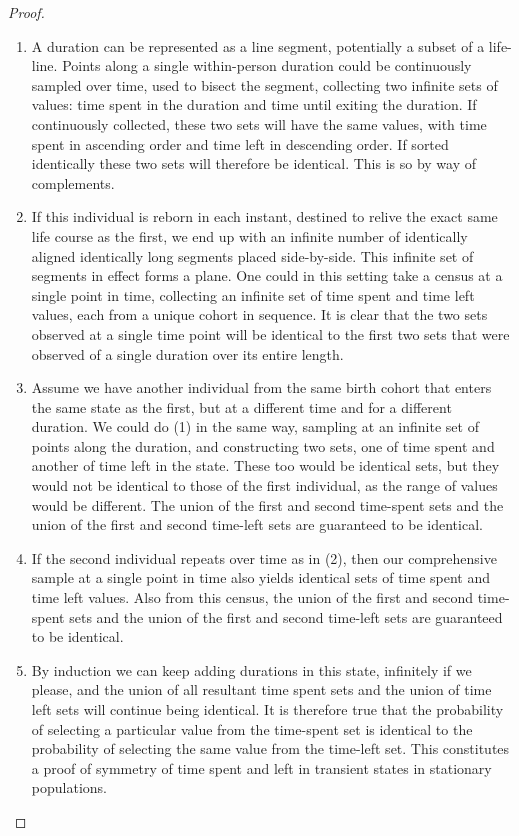 \documentclass[12pt,oneside,a4paper]{article} %
\theoremstyle{definition}
\begin{document}
\begin{proof}

\begin{enumerate}
\item{} A duration can be represented as a line segment, potentially a
subset of a life-line. Points along a single within-person duration could be continuously
sampled over time, used to bisect the segment, collecting two infinite sets of
values: time spent in the duration and time until exiting the duration. If
continuously collected, these two sets will have the same values, with time
spent in ascending order and time left in descending order. If sorted
identically these two sets will therefore be identical. This is so by way of
complements.

\item{} If this individual is reborn in each instant, destined to relive the
exact same life course as the first, we end up with an infinite
number of identically aligned identically long segments placed side-by-side.
This infinite set of segments in effect forms a plane. One could in this
setting take a census at a single point in time, collecting an infinite set of
time spent and time left values, each from a unique cohort in sequence. It is
clear that the two sets observed at a single time point will be identical
to the first two sets that were observed of a single duration over its entire
length.

\item{} Assume we have another individual from the same birth cohort that enters
the same state as the first, but at a different time and for a different
duration. We could do (1) in the same way, sampling at an infinite set of points
along the duration, and constructing two sets, one of time spent and another of
time left in the state. These too would be identical sets, but they would not be
identical to those of the first individual, as the range of values would be
different. The union of the first and second time-spent sets and the union of
the first and second time-left sets are guaranteed to be identical. 

\item{} If the second individual repeats over time as in (2), then our
comprehensive sample at a single point in time also yields identical sets
of time spent and time left values. Also from this census, the union of the
first and second time-spent sets and the union of the first and second time-left sets
are guaranteed to be identical. 

\item{} By induction we can keep adding durations in this state, infinitely if we
please, and the union of all resultant time spent sets and the union of time
left sets will continue being identical. It is therefore true that the
probability of selecting a particular value from the time-spent set is identical
to the probability of selecting the same value from the time-left set. This
constitutes a proof of symmetry of time spent and left in transient states in
stationary populations.
\end{enumerate}
\end{proof}
\end{document}
